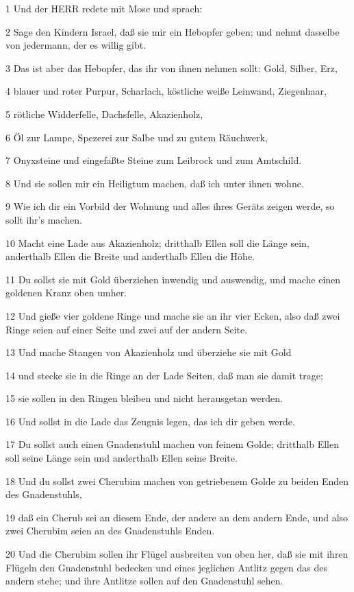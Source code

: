 \par 1 Und der HERR redete mit Mose und sprach:
\par 2 Sage den Kindern Israel, daß sie mir ein Hebopfer geben; und nehmt dasselbe von jedermann, der es willig gibt.
\par 3 Das ist aber das Hebopfer, das ihr von ihnen nehmen sollt: Gold, Silber, Erz,
\par 4 blauer und roter Purpur, Scharlach, köstliche weiße Leinwand, Ziegenhaar,
\par 5 rötliche Widderfelle, Dachsfelle, Akazienholz,
\par 6 Öl zur Lampe, Spezerei zur Salbe und zu gutem Räuchwerk,
\par 7 Onyxsteine und eingefaßte Steine zum Leibrock und zum Amtschild.
\par 8 Und sie sollen mir ein Heiligtum machen, daß ich unter ihnen wohne.
\par 9 Wie ich dir ein Vorbild der Wohnung und alles ihres Geräts zeigen werde, so sollt ihr's machen.
\par 10 Macht eine Lade aus Akazienholz; dritthalb Ellen soll die Länge sein, anderthalb Ellen die Breite und anderthalb Ellen die Höhe.
\par 11 Du sollst sie mit Gold überziehen inwendig und auswendig, und mache einen goldenen Kranz oben umher.
\par 12 Und gieße vier goldene Ringe und mache sie an ihr vier Ecken, also daß zwei Ringe seien auf einer Seite und zwei auf der andern Seite.
\par 13 Und mache Stangen von Akazienholz und überziehe sie mit Gold
\par 14 und stecke sie in die Ringe an der Lade Seiten, daß man sie damit trage;
\par 15 sie sollen in den Ringen bleiben und nicht herausgetan werden.
\par 16 Und sollst in die Lade das Zeugnis legen, das ich dir geben werde.
\par 17 Du sollst auch einen Gnadenstuhl machen von feinem Golde; dritthalb Ellen soll seine Länge sein und anderthalb Ellen seine Breite.
\par 18 Und du sollst zwei Cherubim machen von getriebenem Golde zu beiden Enden des Gnadenstuhls,
\par 19 daß ein Cherub sei an diesem Ende, der andere an dem andern Ende, und also zwei Cherubim seien an des Gnadenstuhls Enden.
\par 20 Und die Cherubim sollen ihr Flügel ausbreiten von oben her, daß sie mit ihren Flügeln den Gnadenstuhl bedecken und eines jeglichen Antlitz gegen das des andern stehe; und ihre Antlitze sollen auf den Gnadenstuhl sehen.
